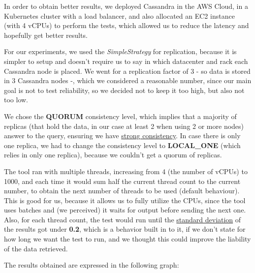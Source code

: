 \documentclass[runningheads]{llncs}
\begin{document}
In order to obtain better results, we deployed Cassandra in the AWS Cloud, in a Kubernetes cluster with a load balancer, and also allocated an EC2 instance (with 4 vCPUs) to perform the tests, which allowed us to reduce the latency and hopefully get better results.\par

For our experiments, we used the \emph{SimpleStrategy} for replication, because it is simpler to setup and doesn't require us to say in which datacenter and rack each Cassandra node is placed. We went for a replication factor of 3 - so data is stored in 3 Cassandra nodes -, which we considered a reasonable number, since our main goal is not to test reliability, so we decided not to keep it too high, but also not too low.\par

We chose the \textbf{QUORUM} consistency level, which implies that a majority of replicas (that hold the data, in our case at least 2 when using 2 or more nodes) answer to the query, ensuring we have \underline{strong consistency}. In case there is only one replica, we had to change the consistency level to \textbf{LOCAL\_ONE} (which relies in only one replica), because we couldn't get a quorum of replicas.\par

The tool ran with multiple threads, increasing from 4 (the number of vCPUs) to 1000, and each time it would sum half the current thread count to the current number, to obtain the next number of threads to be used (default behaviour). This is good for us, because it allows us to fully utilize the CPUs, since the tool uses batches and (we perceived) it waits for output before sending the next one. Also, for each thread count, the test would run until the \underline{standard deviation} of the results got under \textbf{0.2}, which is a behavior built in to it, if we don't state for how long we want the test to run, and we thought this could improve the liability of the data retrieved.\par

The results obtained are expressed in the following graph:
\end{document}
